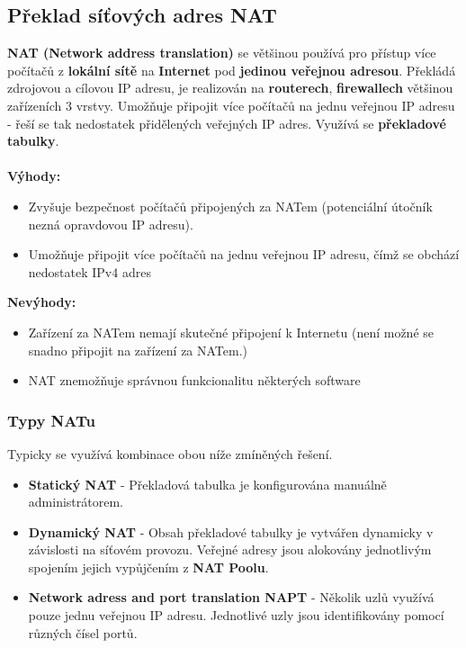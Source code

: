 \subsection{Překlad síťových adres NAT}
\textbf{NAT (Network address translation)} se většinou používá pro přístup více počítačů z \textbf{lokální sítě} na \textbf{Internet} pod \textbf{jedinou veřejnou adresou}. Překládá zdrojovou a cílovou IP adresu, je realizován na \textbf{routerech}, \textbf{firewallech} většinou zařízeních 3 vrstvy. Umožňuje připojit více počítačů na jednu veřejnou IP adresu - řeší se tak nedostatek přidělených veřejných IP adres. Využívá se \textbf{překladové tabulky}. 
\\\\
\textbf{Výhody:} 
\begin{itemize}
	\item Zvyšuje bezpečnost počítačů připojených za NATem (potenciální útočník nezná opravdovou IP adresu). 
	\item Umožňuje připojit více počítačů na jednu veřejnou IP adresu, čímž se obchází nedostatek IPv4 adres
\end{itemize}
\textbf{Nevýhody:}
\begin{itemize}
	\item Zařízení za NATem nemají skutečné připojení k Internetu (není možné se snadno připojit na zařízení za NATem.)
	\item NAT znemožňuje správnou funkcionalitu některých software
\end{itemize}

\subsubsection{Typy NATu}
Typicky se využívá kombinace obou níže zmíněných řešení.
\begin{itemize}
	\item \textbf{Statický NAT} - Překladová tabulka je konfigurována manuálně administrátorem.
	\item \textbf{Dynamický NAT} - Obsah překladové tabulky je vytvářen dynamicky v závislosti na síťovém provozu. Veřejné adresy jsou alokovány jednotlivým spojením jejich vypůjčením z \textbf{NAT Poolu}.
	\item \textbf{Network adress and port translation NAPT} - Několik uzlů využívá pouze jednu veřejnou IP adresu. Jednotlivé uzly jsou identifikovány pomocí různých čísel portů.
\end{itemize}

